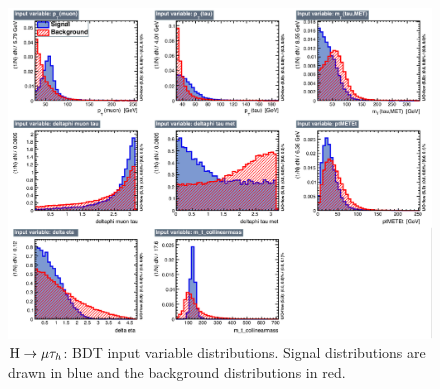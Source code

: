 \begin{figure}[htpb] \label{fig:BDTvariable}
\begin{center}
\includegraphics[width=1.\textwidth]{chapter6/BDTvariable.pdf}
\end{center}
\caption{$\mathrm{H}\to \mu\tau_{h}$: BDT input variable distributions. Signal distributions are drawn in blue and the background  distributions in red.}
\label{fig:bdtInputHmuh}
\end{figure}










